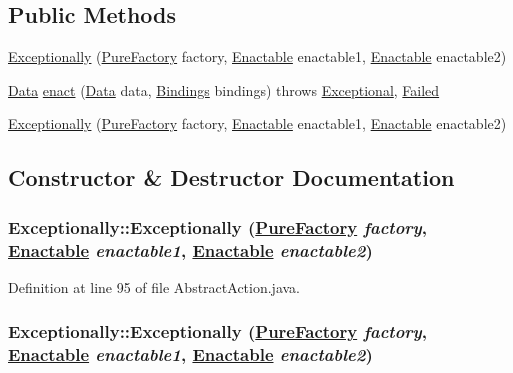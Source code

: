 \subsection*{Public Methods}
\begin{CompactItemize}
\item 
\hyperlink{classExceptionally_a0}{Exceptionally} (\hyperlink{classPureFactory}{Pure\-Factory} factory, \hyperlink{interfaceEnactable}{Enactable} enactable1, \hyperlink{interfaceEnactable}{Enactable} enactable2)
\item 
\hyperlink{interfaceData}{Data} \hyperlink{classExceptionally_a1}{enact} (\hyperlink{interfaceData}{Data} data, \hyperlink{interfaceBindings}{Bindings} bindings) throws \hyperlink{classExceptional}{Exceptional}, \hyperlink{classFailed}{Failed}
\item 
\hyperlink{classExceptionally_a2}{Exceptionally} (\hyperlink{classPureFactory}{Pure\-Factory} factory, \hyperlink{interfaceEnactable}{Enactable} enactable1, \hyperlink{interfaceEnactable}{Enactable} enactable2)
\end{CompactItemize}


\subsection{Constructor \& Destructor Documentation}
\hypertarget{classExceptionally_a0}{
\subsubsection[Exceptionally]{\setlength{\rightskip}{0pt plus 5cm}Exceptionally::Exceptionally (\hyperlink{classPureFactory}{Pure\-Factory} {\em factory}, \hyperlink{interfaceEnactable}{Enactable} {\em enactable1}, \hyperlink{interfaceEnactable}{Enactable} {\em enactable2})}}
\label{classExceptionally_a0}




Definition at line 95 of file Abstract\-Action.java.\hypertarget{classExceptionally_a2}{
\subsubsection[Exceptionally]{\setlength{\rightskip}{0pt plus 5cm}Exceptionally::Exceptionally (\hyperlink{classPureFactory}{Pure\-Factory} {\em factory}, \hyperlink{interfaceEnactable}{Enactable} {\em enactable1}, \hyperlink{interfaceEnactable}{Enactable} {\em enactable2})}}
\label{classExceptionally_a2}




